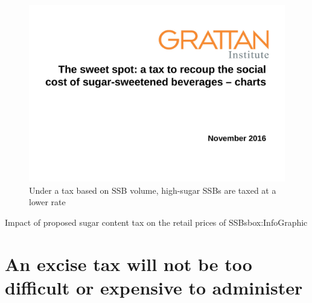 \documentclass[embargoed]{grattan}
\begin{document}
\begin{figure}
\caption{Under a tax based on SSB volume, high-sugar SSBs are taxed at a lower rate}\label{fig:under-tax-based-on-SSB-volume-high-sugar-SSBs-taxed-lower}

\includegraphics[page=12]{atlas/ObesityCharts}


\end{figure}

\begin{bigbox*}{Impact of proposed sugar content tax on the retail prices of SSBs}{box:InfoGraphic}
\begin{figure}[H]


\end{figure}
\end{bigbox*}

\section{An excise tax will not be too difficult or expensive to administer}\label{an-excise-tax-will-not-be-too-difficult-or-expensive-to-administer}
\end{document}
